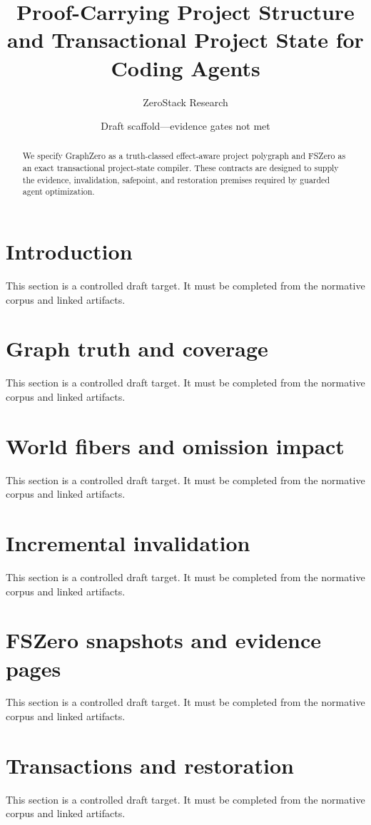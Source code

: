 \documentclass[11pt]{article}
\title{Proof-Carrying Project Structure and Transactional Project State for Coding Agents}
\author{ZeroStack Research}
\date{Draft scaffold---evidence gates not met}
\begin{document}
\maketitle
\begin{abstract}
We specify GraphZero as a truth-classed effect-aware project polygraph and FSZero as an exact transactional project-state compiler. These contracts are designed to supply the evidence, invalidation, safepoint, and restoration premises required by guarded agent optimization.
\end{abstract}
\tableofcontents
\section{Introduction}
This section is a controlled draft target. It must be completed from the normative corpus and linked artifacts.

\section{Graph truth and coverage}
This section is a controlled draft target. It must be completed from the normative corpus and linked artifacts.

\section{World fibers and omission impact}
This section is a controlled draft target. It must be completed from the normative corpus and linked artifacts.

\section{Incremental invalidation}
This section is a controlled draft target. It must be completed from the normative corpus and linked artifacts.

\section{FSZero snapshots and evidence pages}
This section is a controlled draft target. It must be completed from the normative corpus and linked artifacts.

\section{Transactions and restoration}
This section is a controlled draft target. It must be completed from the normative corpus and linked artifacts.
\end{document}
